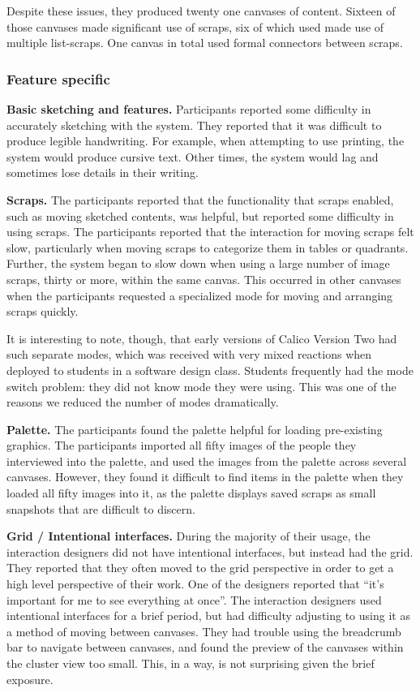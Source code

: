 Despite these issues, they produced twenty one canvases of content. Sixteen of those canvases made significant use of scraps, six of which used made use of multiple list-scraps. One canvas in total used formal connectors between scraps.

\subsubsection{Feature specific}

\textbf{Basic sketching and features.} Participants reported some difficulty in accurately sketching with the system. They reported that it was difficult to produce legible handwriting. For example, when attempting to use printing, the system would produce cursive text. Other times, the system would lag and sometimes lose details in their writing.

\textbf{Scraps.} The participants reported that the functionality that scraps enabled, such as moving sketched contents, was helpful, but reported some difficulty in using scraps. The participants reported that the interaction for moving scraps felt slow, particularly when moving scraps to categorize them in tables or quadrants. Further, the system began to slow down when using a large number of image scraps, thirty or more, within the same canvas. This occurred in other canvases when the participants requested a specialized mode for moving and arranging scraps quickly.

It is interesting to note, though, that early versions of Calico Version Two had such separate modes, which was received with very mixed reactions when deployed to students in a software design class. Students frequently had the mode switch problem: they did not know mode they were using. This was one of the reasons we reduced the number of modes dramatically.

\textbf{Palette.} The participants found the palette helpful for loading pre-existing graphics. The participants imported all fifty images of the people they interviewed into the palette, and used the images from the palette across several canvases. However, they found it difficult to find items in the palette when they loaded all fifty images into it, as the palette displays saved scraps as small snapshots that are difficult to discern.

\textbf{Grid / Intentional interfaces.} During the majority of their usage, the interaction designers did not have intentional interfaces, but instead had the grid. They reported that they often moved to the grid perspective in order to get a high level perspective of their work. One of the designers reported that ``it's important for me to see everything at once''. The interaction designers used intentional interfaces for a brief period, but had difficulty adjusting to using it as a method of moving between canvases. They had trouble using the breadcrumb bar to navigate between canvases, and found the preview of the canvases within the cluster view too small. This, in a way, is not surprising given the brief exposure.

